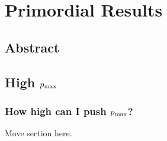 %
\chapter{Primordial Results}\label{chapter:primordial_results}
\section{Abstract}\label{sec:primordial_abstract}
\section{High $p_\text{max}$}\label{sec:high_pmax}
\subsection{How high can I push $p_\text{max}$?}
Move section here.

